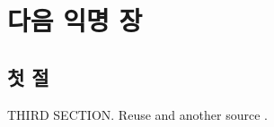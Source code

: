 \chapter{다음 익명 장}
\section{첫 절}
THIRD SECTION. Reuse \citep{alpha} and another source \citep{beta}.
